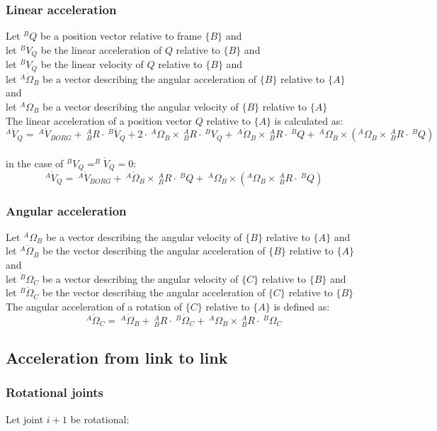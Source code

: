 \documentclass[10pt,a4paper]{article}
\begin{document}
\subsubsection{Linear acceleration}
Let $^BQ$ be a position vector relative to frame $\{B\}$ and \\
let $^B\dot V_Q$ be the linear acceleration of $Q$ relative to $\{B\}$ and \\
let $^B V_Q$ be the linear velocity of $Q$ relative to $\{B\}$ and \\
let $^A\dot \Omega_B$ be a vector describing the angular acceleration of $\{B\}$ relative to $\{A\}$ and \\
let $^A\Omega_B$ be a vector describing the angular velocity of $\{B\}$ relative to $\{A\}$ \\
The linear acceleration of a position vector $Q$ relative to $\{A\}$ is calculated as:
$$
	^A\dot V_Q = ~^A\dot{V}_{BORG} + ~^A_BR ⋅ ~^B\dot V_Q + 2 ⋅ ~^A\Omega_B \times ~^A_BR ⋅ ~^BV_Q + ~^A\dot \Omega_B \times ~^A_BR ⋅ ~^BQ + ~^A\Omega_B \times (^A\Omega_B \times ~^A_BR ⋅ ~^BQ)
$$
\\
in the case of $^BV_Q = ^B\dot{V}_Q = 0$:
$$
^A\dot V_Q = ~^A\dot{V}_{BORG} + ~^A\dot \Omega_B \times ~^A_BR ⋅ ~^BQ + ~^A\Omega_B \times (^A\Omega_B \times ~^A_BR ⋅ ~^BQ)
$$

\subsubsection{Angular acceleration}
Let $^A\Omega_B$ be a vector describing the angular velocity of $\{B\}$ relative to $\{A\}$ and \\
let $^A\dot \Omega_B$ be the vector describing the angular acceleration of $\{B\}$ relative to $\{A\}$ and \\
let $^B\Omega_C$ be a vector describing the angular velocity of $\{C\}$ relative to $\{B\}$ and \\
let $^B\dot \Omega_C$ be the vector describing the angular acceleration of $\{C\}$ relative to $\{B\}$ \\
The angular acceleration of a rotation of $\{C\}$ relative to $\{A\}$ is defined as:
$$
	^A\dot \Omega_C = ~^A\dot \Omega_B + ~^A_BR ⋅ ~^B \dot \Omega_C + ~^A\Omega_B \times ~^A_BR ⋅ ~^B\Omega_C
$$

\subsection{Acceleration from link to link}
\subsubsection{Rotational joints}
Let joint $i+1$ be rotational: \\
\end{document}
